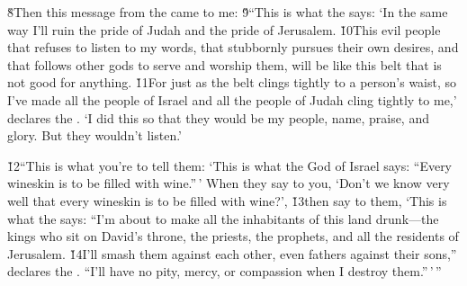 \v{8}Then this message from the  came to me: \v{9}``This is what the  says: `In the same way I'll ruin the pride of Judah and the pride of Jerusalem. \v{10}This evil people that refuses to listen to my words, that stubbornly pursues their own desires, and that follows other gods to serve and worship them, will be like this belt that is not good for anything. \v{11}For just as the belt clings tightly to a person's waist, so I've made all the people of Israel and all the people of Judah cling tightly to me,' declares the . `I did this so that they would be my people, name, praise, and glory. But they wouldn't listen.'

\v{12}``This is what you're to tell them: `This is what the  God of Israel says: ``Every wineskin is to be filled with wine.''\,' When they say to you, `Don't we know very well that every wineskin is to be filled with wine?', \v{13}then say to them, `This is what the  says: ``I'm about to make all the inhabitants of this land drunk---the kings who sit on David's throne, the priests, the prophets, and all the residents of Jerusalem. \v{14}I'll smash them against each other, even fathers against their sons,'' declares the . ``I'll have no pity, mercy, or compassion when I destroy them.''\,'\,''

